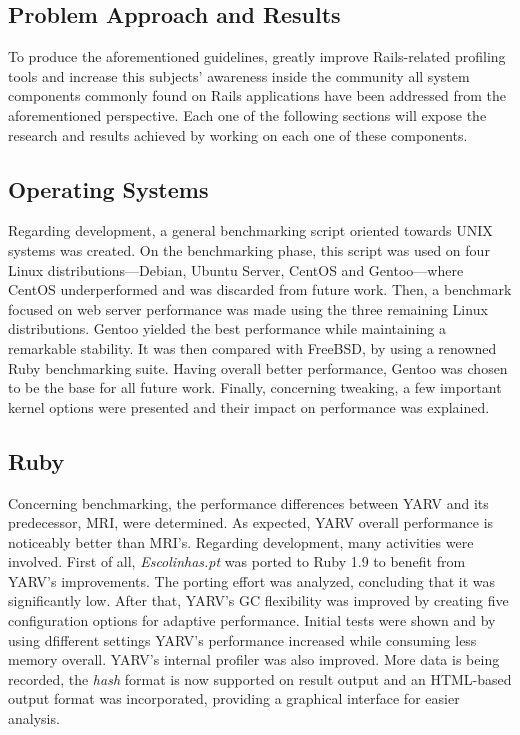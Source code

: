 \documentclass[9pt,a4paper]{extarticle}
\begin{document}
\begin{multicols}{2}
\section{Problem Approach and Results}
To produce the aforementioned guidelines, greatly improve Rails-related profiling tools and increase this subjects' awareness inside the community all system components commonly found on Rails applications have been addressed from the aforementioned perspective. Each one of the following sections will expose the research and results achieved by working on each one of these components.


\subsection{Operating Systems}
Regarding development, a general benchmarking script oriented towards UNIX systems was created. On the benchmarking phase, this script was used on four Linux distributions---Debian, Ubuntu Server, CentOS and Gentoo---where CentOS underperformed and was discarded from future work. Then, a benchmark focused on web server performance was made using the three remaining Linux distributions. Gentoo yielded the best performance while maintaining a remarkable stability. It was then compared with FreeBSD, by using a renowned Ruby benchmarking suite. Having overall better performance, Gentoo was chosen to be the base for all future work. Finally, concerning tweaking, a few important kernel options were presented and their impact on performance was explained. 


\subsection{Ruby}
Concerning benchmarking, the performance differences between YARV and its predecessor, MRI, were determined. As expected, YARV overall performance is noticeably better than MRI's. Regarding development, many activities were involved. First of all, \textit{Escolinhas.pt} was ported to Ruby 1.9 to benefit from YARV's improvements. The porting effort was analyzed, concluding that it was significantly low. After that, YARV's GC flexibility was improved by creating five configuration options for adaptive performance. Initial tests were shown and by using dfifferent settings YARV's performance increased while consuming less memory overall. YARV's internal profiler was also improved. More data is being recorded, the \textit{hash} format is now supported on result output and an HTML-based output format was incorporated, providing a graphical interface for easier analysis.



\end{multicols}
\end{document}
